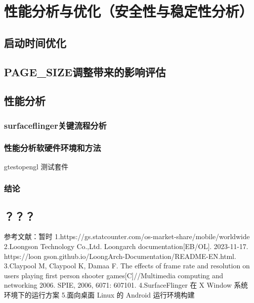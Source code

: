 
\chapter{性能分析与优化（安全性与稳定性分析）}

\section{启动时间优化}

\section{PAGE\_SIZE调整带来的影响评估}

\section{性能分析}

\subsection{surfaceflinger关键流程分析}

\subsection{性能分析软硬件环境和方法} gtestopengl 测试套件

\subsection{结论}

\section{？？？}

参考文献：暂时
1.https://gs.statcounter.com/os-market-share/mobile/worldwide
2.Loongson Technology Co.,Ltd. Loongarch documentation[EB/OL]. 2023-11-17. https://loon
gson.github.io/LoongArch-Documentation/README-EN.html.
3.Claypool M, Claypool K, Damaa F. The effects of frame rate and resolution 
on users playing first person shooter games[C]//Multimedia computing and networking 2006. SPIE, 2006, 6071: 607101.
4.SurfaceFlinger 在 X Window 系统环境下的运行方案
5.面向桌面 Linux 的 Android 运行环境构建

